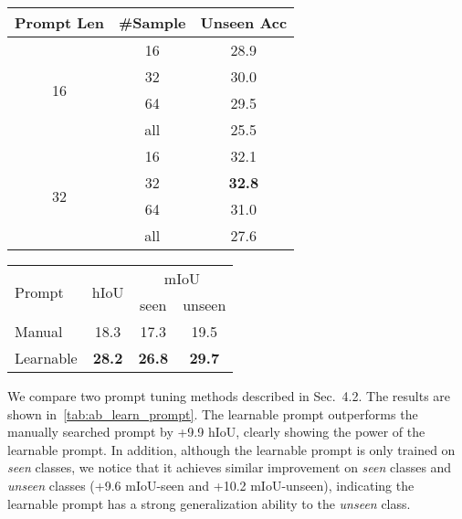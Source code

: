 \documentclass[runningheads]{llncs}
\makeatletter
\newcommand\tabcaption{\def\@captype{table}\caption}
\makeatother
\begin{document}
\begin{figtab}
\footnotesize
\begin{minipage}[t]{0.48\linewidth}
    \centering
    \tabcaption{Study the effect of prompt length and sample number of each category for prompt learning.}
    \vspace{0.5em}
    \begin{tabular}{c|c|c}
    \toprule
      Prompt Len& \#Sample & Unseen Acc\\
      \hline
      \multirow{4}{*}{16}&16&28.9  \\
      &32&30.0\\
      &64&29.5\\
      &all&25.5\\
      \hline
      \multirow{4}{*}{32}&16&32.1\\
      &32&\textbf{32.8}\\
      &64&31.0\\
      &all&27.6\\
    \bottomrule
    \end{tabular}
    \label{tab:promt_hyper}
\end{minipage}\quad
\begin{minipage}[t]{0.48\linewidth}
    \centering
    \tabcaption{Manually designed prompt v.s. Learnable prompt.}
    \vspace{1em}
    \begin{tabular}{l|c|c|c}
    \toprule
      \multirow{2}{*}{Prompt} & \multirow{2}{*}{hIoU} & \multicolumn{2}{c}{mIoU}\\
      \cline{3-4}
      && seen & unseen\\
      \hline
      Manual&18.3&17.3&19.5\\
      Learnable&\textbf{28.2} &\textbf{26.8}&\textbf{29.7}\\
    \bottomrule
    \end{tabular}
    \label{tab:ab_learn_prompt}
\end{minipage}
\end{figtab}


We compare two prompt tuning methods described in Sec.~4.2. The results are shown in~\cref{tab:ab_learn_prompt}. The learnable prompt outperforms the manually searched prompt by +9.9 hIoU, clearly showing the power of the learnable prompt. In addition, although the learnable prompt is only trained on \emph{seen} classes, we notice that it achieves similar improvement on \emph{seen} classes and \emph{unseen} classes (+9.6 mIoU-seen and +10.2 mIoU-unseen), indicating the learnable prompt has a strong generalization ability to the \emph{unseen} class. 
\end{document}
